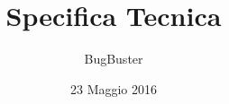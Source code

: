 



\title{\textbf{Specifica Tecnica}}
\author{BugBuster}

\date{23 Maggio 2016}




\makeFrontPage

\tableofcontents





